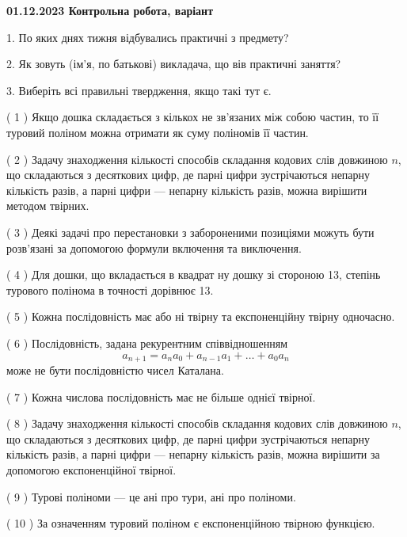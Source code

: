 \documentclass[12pt, ukrainian]{article}
\begin{document}
\vspace{4mm}
\newpage
\begin {large}

\textbf{01.12.2023 Контрольна робота, варіант  }\par


{
1. По яких днях тижня відбувались практичні з предмету?



\vspace{5mm}
2. Як зовуть (ім'я, по батькові) викладача, що вів практичні заняття?



\vspace{5mm}
3. Виберіть всі правильні твердження, якщо такі тут є.\par
\vspace{2mm}
( 1 ) Якщо дошка складається з кількох не зв’язаних між собою частин, то її туровий поліном можна отримати як суму поліномів її частин.%

( 2 ) Задачу знаходження кількості способів складання кодових слів довжиною $n$, що складаються з десяткових цифр, де парні цифри зустрічаються непарну кількість разів, а парні цифри — непарну кількість разів, можна вирішити методом твірних.%

( 3 ) Деякі задачі про перестановки з забороненими позиціями можуть бути розв’я\-за\-ні за допомогою формули включення та виключення.%

( 4 ) Для дошки, що вкладається в квадрат ну дошку зі стороною 13, степінь турового полінома в точності дорівнює 13.%

( 5 ) Кожна послідовність має або ні твірну та експоненційну твірну одночасно.%

( 6 ) Послідовність, задана рекурентним співвідношенням $$a_{n+1}=a_{n}a_{0}+a_{n-1}a_{1}+\ldots+a_0a_{n}$$ може не бути послідовністю чисел Каталана.%

( 7 ) Кожна числова послідовність має не більше однієї твірної.%

( 8 ) Задачу знаходження кількості способів складання кодових слів довжиною $n$, що складаються з десяткових цифр, де парні цифри зустрічаються непарну кількість разів, а парні цифри — непарну кількість разів, можна вирішити за допомогою експоненційної твірної.%

( 9 ) Турові поліноми --- це ані про тури, ані про поліноми.%

( 10 ) За означенням туровий поліном є експоненційною твірною функцією.%
}
\end {large}
\end{document}
